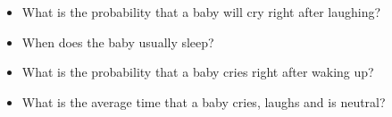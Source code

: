 \documentclass[paper=a4, fontsize=11pt]{scrartcl}
\numberwithin{equation}{section}
\numberwithin{figure}{section}
\numberwithin{table}{section}
\begin{document}
\begin{itemize}
	\item What is the probability that a baby will cry right after laughing?
    \item When does the baby usually sleep?
    \item What is the probability that a baby cries right after waking up?
    \item What is the average time that a baby cries, laughs and is neutral? 
\end{itemize}
\end{document}

